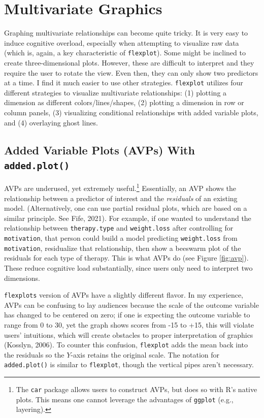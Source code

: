 \documentclass[
  english,
  man]{apa6}
\begin{document}
\normalsize

\hypertarget{multivariate-graphics}{%
\section{Multivariate Graphics}\label{multivariate-graphics}}

Graphing multivariate relationships can become quite tricky. It is very easy to induce cognitive overload, especially when attempting to visualize raw data (which is, again, a key characteristic of \texttt{flexplot}). Some might be inclined to create three-dimensional plots. However, these are difficult to interpret and they require the user to rotate the view. Even then, they can only show two predictors at a time. I find it much easier to use other strategies. \texttt{flexplot} utilizes four different strategies to visualize multivariate relationships: (1) plotting a dimension as different colors/lines/shapes, (2) plotting a dimension in row or column panels, (3) visualizing conditional relationships with added variable plots, and (4) overlaying ghost lines.

\hypertarget{added-variable-plots-avps-with-added.plot}{%
\subsection{\texorpdfstring{Added Variable Plots (AVPs) With \texttt{added.plot()}}{Added Variable Plots (AVPs) With added.plot()}}\label{added-variable-plots-avps-with-added.plot}}

AVPs are underused, yet extremely useful.\footnote{The \texttt{car} package allows users to construct AVPs, but does so with R's native plots. This means one cannot leverage the advantages of \texttt{ggplot} (e.g., layering).} Essentially, an AVP shows the relationship between a predictor of interest and the \emph{residuals} of an existing model. (Alternatively, one can use partial residual plots, which are based on a similar principle. See Fife, 2021). For example, if one wanted to understand the relationship between \texttt{therapy.type} and \texttt{weight.loss} after controlling for \texttt{motivation}, that person could build a model predicting \texttt{weight.loss} from \texttt{motivation}, residualize that relationship, then show a beeswarm plot of the residuals for each type of therapy. This is what AVPs do (see Figure \ref{fig:avp}). These reduce cognitive load substantially, since users only need to interpret two dimensions.

\texttt{flexplot\textquotesingle{}s} version of AVPs have a slightly different flavor. In my experience, AVPs can be confusing to lay audiences because the scale of the outcome variable has changed to be centered on zero; if one is expecting the outcome variable to range from 0 to 30, yet the graph shows scores from -15 to +15, this will violate users' intuitions, which will create obstacles to proper interpretation of graphics (Kosslyn, 2006). To counter this confusion, \texttt{flexplot} adds the mean back into the residuals so the \(Y\)-axis retains the original scale. The notation for \texttt{added.plot()} is similar to \texttt{flexplot}, though the vertical pipes aren't necessary.
\end{document}
